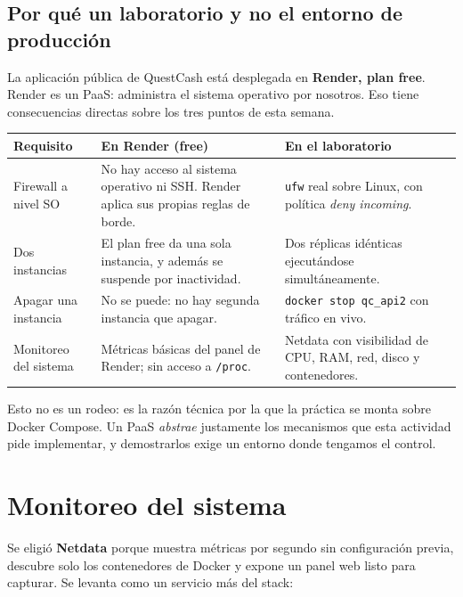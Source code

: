 \documentclass[11pt,letterpaper]{article}
\begin{document}
\subsection{Por qué un laboratorio y no el entorno de producción}

La aplicación pública de QuestCash está desplegada en \textbf{Render, plan free}.
Render es un PaaS: administra el sistema operativo por nosotros. Eso tiene
consecuencias directas sobre los tres puntos de esta semana.

\begin{center}
\begin{tabular}{@{}p{4.3cm} p{5.1cm} p{5.2cm}@{}}
\toprule
\textbf{Requisito} & \textbf{En Render (free)} & \textbf{En el laboratorio} \\
\midrule
Firewall a nivel SO &
  No hay acceso al sistema operativo ni SSH. Render aplica sus propias reglas de borde. &
  \texttt{ufw} real sobre Linux, con política \emph{deny incoming}. \\[4pt]
Dos instancias &
  El plan free da una sola instancia, y además se suspende por inactividad. &
  Dos réplicas idénticas ejecutándose simultáneamente. \\[4pt]
Apagar una instancia &
  No se puede: no hay segunda instancia que apagar. &
  \texttt{docker stop qc\_api2} con tráfico en vivo. \\[4pt]
Monitoreo del sistema &
  Métricas básicas del panel de Render; sin acceso a \texttt{/proc}. &
  Netdata con visibilidad de CPU, RAM, red, disco y contenedores. \\
\bottomrule
\end{tabular}
\end{center}

\noindent Esto no es un rodeo: es la razón técnica por la que la práctica se
monta sobre Docker Compose. Un PaaS \emph{abstrae} justamente los mecanismos que
esta actividad pide implementar, y demostrarlos exige un entorno donde tengamos
el control.

\section{Monitoreo del sistema}

Se eligió \textbf{Netdata} porque muestra métricas por segundo sin configuración
previa, descubre solo los contenedores de Docker y expone un panel web listo
para capturar. Se levanta como un servicio más del stack:
\end{document}
